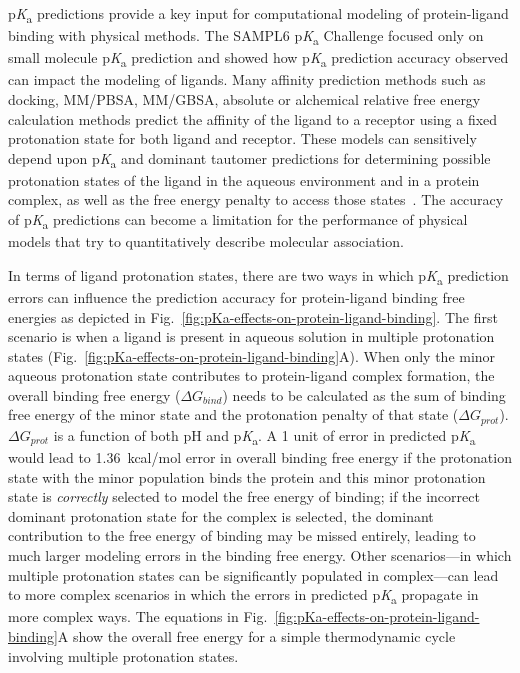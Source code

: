 \documentclass[9pt,lineno,final]{elife}
\newcommand{\pKa}{p\textit{K}\textsubscript{a}}
\begin{document}
\pKa{} predictions provide a key input for computational modeling of protein-ligand binding with physical methods.
The SAMPL6 \pKa{} Challenge focused only on small molecule \pKa{} prediction and showed how \pKa{} prediction accuracy observed can impact the modeling of ligands.
Many affinity prediction methods such as docking,  MM/PBSA, MM/GBSA, absolute or alchemical relative free energy calculation methods predict the affinity of the ligand to a receptor using a fixed protonation state for both ligand and receptor.
These models can sensitively depend upon \pKa{} and dominant tautomer predictions for determining possible protonation states of the ligand in the aqueous environment and in a protein complex, as well as the free energy penalty to access those states~\citep{deOliveira:2019:J.Chem.TheoryComput.}. 
The accuracy of \pKa{} predictions can become a limitation for the performance of physical models that try to quantitatively describe molecular association.

In terms of ligand protonation states, there are two ways in which \pKa{} prediction errors can influence the prediction accuracy for protein-ligand binding free energies as depicted in Fig.~\ref{fig:pKa-effects-on-protein-ligand-binding}. 
The first scenario is when a ligand is present in aqueous solution in multiple protonation states (Fig.~\ref{fig:pKa-effects-on-protein-ligand-binding}A).
When only the minor aqueous protonation state contributes to protein-ligand complex formation, the overall binding free energy ($\Delta G_{bind}$) needs to be calculated as the sum of binding free energy of the minor state and the protonation penalty of that state ($\Delta G_{prot}$). 
$\Delta G_{prot}$ is a function of both pH and \pKa{}.
A 1 unit of error in predicted \pKa{} would lead to 1.36~kcal/mol error in overall binding free energy if the protonation state with the minor population binds the protein and this minor protonation state is \emph{correctly} selected to model the free energy of binding; if the incorrect dominant protonation state for the complex is selected, the dominant contribution to the free energy of binding may be missed entirely, leading to much larger modeling errors in the binding free energy. 
Other scenarios---in which multiple protonation states can be significantly populated in complex---can lead to more complex scenarios in which the errors in predicted \pKa{} propagate in more complex ways.
The equations in Fig.~\ref{fig:pKa-effects-on-protein-ligand-binding}A show the overall free energy for a simple thermodynamic cycle involving multiple protonation states.
\end{document}
